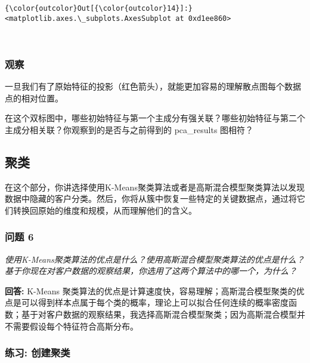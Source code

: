 \documentclass[11pt]{article}
\begin{document}
\begin{Verbatim}[commandchars=\\\{\}]
{\color{outcolor}Out[{\color{outcolor}14}]:} <matplotlib.axes.\_subplots.AxesSubplot at 0xd1ee860>
\end{Verbatim}
            
    \begin{center}
    \end{center}
    { \hspace*{\fill} \\}
    
    \hypertarget{ux89c2ux5bdf}{%
\subsubsection{观察}\label{ux89c2ux5bdf}}

一旦我们有了原始特征的投影（红色箭头），就能更加容易的理解散点图每个数据点的相对位置。

在这个双标图中，哪些初始特征与第一个主成分有强关联？哪些初始特征与第二个主成分相关联？你观察到的是否与之前得到的
pca\_results 图相符？

    \hypertarget{ux805aux7c7b}{%
\subsection{聚类}\label{ux805aux7c7b}}

在这个部分，你讲选择使用K-Means聚类算法或者是高斯混合模型聚类算法以发现数据中隐藏的客户分类。然后，你将从簇中恢复一些特定的关键数据点，通过将它们转换回原始的维度和规模，从而理解他们的含义。

    \hypertarget{ux95eeux9898-6}{%
\subsubsection{问题 6}\label{ux95eeux9898-6}}

\emph{使用K-Means聚类算法的优点是什么？使用高斯混合模型聚类算法的优点是什么？基于你现在对客户数据的观察结果，你选用了这两个算法中的哪一个，为什么？}

    \textbf{回答:} K-Means
聚类算法的优点是计算速度快，容易理解；高斯混合模型聚类的优点是可以得到样本点属于每个类的概率，理论上可以拟合任何连续的概率密度函数；基于对客户数据的观察结果，我选择高斯混合模型聚类；因为高斯混合模型并不需要假设每个特征符合高斯分布。

    \hypertarget{ux7ec3ux4e60-ux521bux5efaux805aux7c7b}{%
\subsubsection{练习:
创建聚类}\label{ux7ec3ux4e60-ux521bux5efaux805aux7c7b}}
\end{document}
